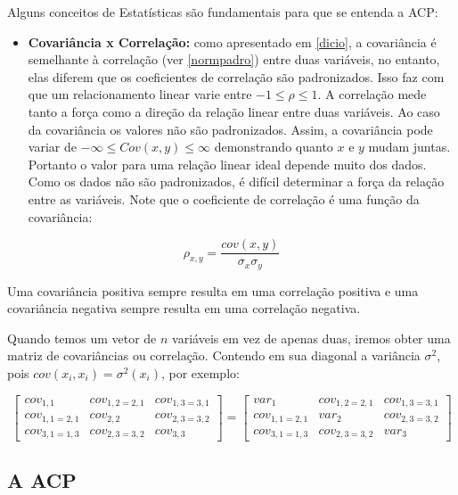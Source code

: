 \documentclass[
]{book}
\providecommand{\tightlist}{%
  \setlength{\itemsep}{0pt}\setlength{\parskip}{0pt}}
\begin{document}
Alguns conceitos de Estatísticas são fundamentais para que se entenda a ACP:

\begin{itemize}
\tightlist
\item
  \textbf{Covariância x Correlação:} como apresentado em \ref{dicio}, a covariância é semelhante à correlação (ver \ref{normpadro}) entre duas variáveis, no entanto, elas diferem que os coeficientes de correlação são padronizados. Isso faz com que um relacionamento linear varie entre \(-1 \leq \rho \leq 1\). A correlação mede tanto a força como a direção da relação linear entre duas variáveis. Ao caso da covariância os valores não são padronizados. Assim, a covariância pode variar de \(-\infty \leq Cov (x,y) \leq \infty\) demonstrando quanto \(x\) e \(y\) mudam juntas. Portanto o valor para uma relação linear ideal depende muito dos dados. Como os dados não são padronizados, é difícil determinar a força da relação entre as variáveis. Note que o coeficiente de correlação é uma função da covariância:
\end{itemize}

\[\rho_{x,y}=\frac{cov(x,y)}{\sigma_x \sigma_y}\]

Uma covariância positiva sempre resulta em uma correlação positiva e uma covariância negativa sempre resulta em uma correlação negativa.

Quando temos um vetor de \(n\) variáveis em vez de apenas duas, iremos obter uma matriz de covariâncias ou correlação. Contendo em sua diagonal a variância \(\sigma^2\), pois \(cov(x_i,x_i)=\sigma^2(x_i)\), por exemplo:

\[\begin{bmatrix}
cov_{1,1} &cov_{1,2=2,1}  &cov_{1,3=3,1} \\ 
cov_{1,1=2,1} &cov_{2,2}  &cov_{2,3=3,2} \\ 
cov_{3,1=1,3} &cov_{2,3=3,2} & cov_{3,3}
\end{bmatrix} = \begin{bmatrix}
var_{1} &cov_{1,2=2,1}  &cov_{1,3=3,1} \\ 
cov_{1,1=2,1} &var_{2}  &cov_{2,3=3,2} \\ 
cov_{3,1=1,3} &cov_{2,3=3,2} & var_{3}
\end{bmatrix}\]

\hypertarget{a-acp}{%
\subsection{A ACP}\label{a-acp}}
\end{document}
